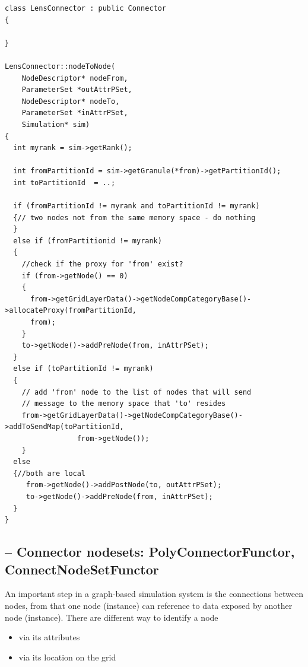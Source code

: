 \begin{verbatim}
class LensConnector : public Connector
{

}

LensConnector::nodeToNode( 
    NodeDescriptor* nodeFrom,
    ParameterSet *outAttrPSet,
    NodeDescriptor* nodeTo,
    ParameterSet *inAttrPSet,
    Simulation* sim)
{
  int myrank = sim->getRank();
  
  int fromPartitionId = sim->getGranule(*from)->getPartitionId();
  int toPartitionId  = ..;
  
  if (fromPartitionId != myrank and toPartitionId != myrank)
  {// two nodes not from the same memory space - do nothing
  }
  else if (fromPartitionid != myrank)
  {
    //check if the proxy for 'from' exist?
    if (from->getNode() == 0)
    {
      from->getGridLayerData()->getNodeCompCategoryBase()->allocateProxy(fromPartitionId,
      from);
    }
    to->getNode()->addPreNode(from, inAttrPSet);
  }
  else if (toPartitionId != myrank)
  {
    // add 'from' node to the list of nodes that will send 
    // message to the memory space that 'to' resides
    from->getGridLayerData()->getNodeCompCategoryBase()->addToSendMap(toPartitionId,
                 from->getNode());
    }
  else 
  {//both are local
     from->getNode()->addPostNode(to, outAttrPSet);
     to->getNode()->addPreNode(from, inAttrPSet);
  }
}
\end{verbatim}



% 


\subsection{-- Connector nodesets: PolyConnectorFunctor, ConnectNodeSetFunctor}
\label{sec:functor-connect-nodesets}


An important step in a graph-based simulation system is the connections between
nodes, from that one node (instance) can reference to data exposed by another node (instance). 
There are different way to identify a node
\begin{itemize}
  \item via its attributes 
  
  \item via its location on the grid
\end{itemize}

